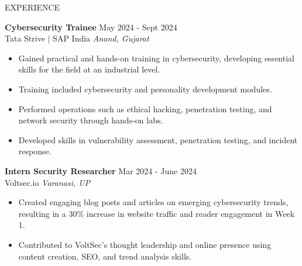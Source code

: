 \documentclass{resume} %
\begin{document}
\begin{rSection}{EXPERIENCE}

\textbf{Cybersecurity Trainee} \hfill May 2024 - Sept 2024\\
Tata Strive $|$ SAP India \hfill \textit{Anand, Gujarat}
 \begin{itemize}
    \itemsep -3pt {} 
    \item Gained practical and hands-on training in cybersecurity, developing essential skills for the field at an industrial level.
    \item Training included cybersecurity and personality development modules.
    \item Performed operations such as ethical hacking, penetration testing, and network security through hands-on labs.
    \item Developed skills in vulnerability assessment, penetration testing, and incident response.
 \end{itemize}
 
\textbf{Intern Security Researcher} \hfill Mar 2024 - June 2024\\
Voltsec.io \hfill \textit{Varanasi, UP}
 \begin{itemize}
    \itemsep -3pt {} 
     \item Created engaging blog posts and articles on emerging cybersecurity trends, resulting in a 30\% increase in website traffic and reader engagement in Week 1.
     \item Contributed to VoltSec’s thought leadership and online presence using content creation, SEO, and trend analysis skills. 
 \end{itemize}

\end{rSection}
\end{document}

